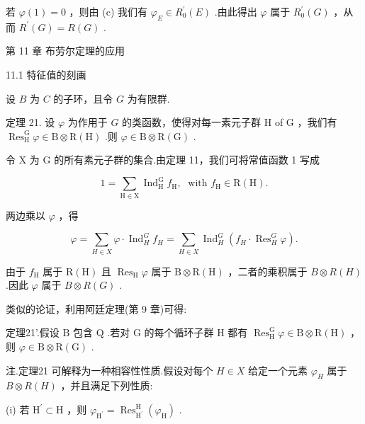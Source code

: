 \documentclass[10pt]{article}
\begin{document}
若 \(\varphi \left( 1\right)  = 0\) ，则由 (c) 我们有 \({\varphi }_{E} \in  {R}_{0}^{\prime }\left( E\right)\) .由此得出 \(\varphi\) 属于 \({R}_{0}^{\prime }\left( G\right)\) ，从而 \({R}^{\prime }\left( G\right)  = R\left( G\right)\) .

第 11 章 布劳尔定理的应用

11.1 特征值的刻画

设 \(B\) 为 \(C\) 的子环，且令 \(G\) 为有限群.

定理 21. 设 \(\varphi\) 为作用于 \(G\) 的类函数，使得对每一素元子群 \(\mathrm{H}\) of \(\mathrm{G}\) ，我们有 \({\operatorname{Res}}_{\mathrm{H}}^{\mathrm{G}}\varphi  \in  \mathrm{B} \otimes  \mathrm{R}\left( \mathrm{H}\right)\) .则 \(\varphi  \in  \mathrm{B} \otimes  \mathrm{R}\left( \mathrm{G}\right)\) .

令 \(\mathrm{X}\) 为 G 的所有素元子群的集合.由定理 11，我们可将常值函数 1 写成

\[
1 = \mathop{\sum }\limits_{{\mathrm{H} \in  \mathrm{X}}}{\operatorname{Ind}}_{\mathrm{H}}^{\mathrm{G}}{f}_{\mathrm{H}},\;\text{ with }{f}_{\mathrm{H}} \in  \mathrm{R}\left( \mathrm{H}\right) .
\]

两边乘以 \(\varphi\) ，得

\[
\varphi  = \mathop{\sum }\limits_{{H \in  X}}\varphi  \cdot  {\operatorname{Ind}}_{H}^{G}{f}_{H} = \mathop{\sum }\limits_{{H \in  X}}{\operatorname{Ind}}_{H}^{G}\left( {{f}_{H} \cdot  {\operatorname{Res}}_{H}^{G}\varphi }\right) .
\]

由于 \({f}_{\mathrm{H}}\) 属于 \(\mathrm{R}\left( \mathrm{H}\right)\) 且 \({\operatorname{Res}}_{\mathrm{H}}\varphi\) 属于 \(\mathrm{B} \otimes  \mathrm{R}\left( \mathrm{H}\right)\) ，二者的乘积属于 \(B \otimes  R\left( H\right)\) .因此 \(\varphi\) 属于 \(B \otimes  R\left( G\right)\) .

类似的论证，利用阿廷定理(第 9 章)可得:

定理21’.假设 \(\mathrm{B}\) 包含 \(\mathrm{Q}\) .若对 \(\mathrm{G}\) 的每个循环子群 \(\mathrm{H}\) 都有 \({\operatorname{Res}}_{\mathrm{H}}^{\mathrm{G}}\varphi  \in  \mathrm{B} \otimes  \mathrm{R}\left( \mathrm{H}\right)\) ，则 \(\varphi  \in  \mathrm{B} \otimes  \mathrm{R}\left( \mathrm{G}\right)\) .

注.定理21 可解释为一种相容性性质.假设对每个 \(H \in  X\) 给定一个元素 \({\varphi }_{H}\) 属于 \(B \otimes  R\left( H\right)\) ，并且满足下列性质:

(i) 若 \({\mathrm{H}}^{\prime } \subset  \mathrm{H}\) ，则 \({\varphi }_{{\mathrm{H}}^{\prime }} = {\operatorname{Res}}_{{\mathrm{H}}^{\prime }}^{\mathrm{H}}\left( {\varphi }_{\mathrm{H}}\right)\) .
\end{document}
